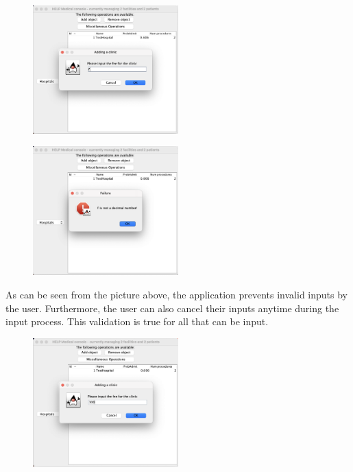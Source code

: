 \documentclass{article}
\begin{document}
\begin{figure}
  \begin{center}
    \includegraphics[width=0.5\textwidth]{./figures/Add/Clinic_3.png}
  \end{center}
\end{figure}

\begin{figure}
  \begin{center}
    \includegraphics[width=0.5\textwidth]{./figures/Add/Clinic_4.png}
  \end{center}
\end{figure}

As can be seen from the picture above, the application prevents invalid inputs by the user. Furthermore, the user can also cancel their inputs anytime during the input process. This validation is true for all that can be input.

\begin{figure}
  \begin{center}
    \includegraphics[width=0.5\textwidth]{./figures/Add/Clinic_5.png}
  \end{center}
\end{figure}
\end{document}
